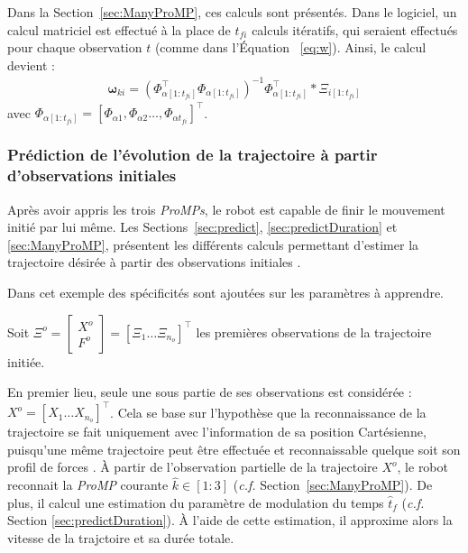 \documentclass[utf8]{frontiersSCNS} %
\newcommand{\rev}[1]{\textcolor{blue}{#1}}
\begin{document}
Dans la Section~\ref{sec:ManyProMP}, ces calculs sont présentés. Dans  le logiciel, un calcul matriciel est effectué à la place de $t_{fi}$ calculs itératifs, qui seraient effectués pour chaque observation $t$ (comme dans l'Équation ~\ref{eq:w}). Ainsi, le calcul devient :
\begin{eqnarray}
\boldsymbol{\omega}_{ki} = (\Phi_{\alpha [1:t_{fi}]}^\top \Phi_{\alpha [1:t_{fi}]})^{-1} \Phi_{\alpha [1:t_{fi}]}^\top * \Xi_{i {[1:t_{fi}]}}
\end{eqnarray}
avec $\Phi_{\alpha [1:t_{fi}]} = [\Phi_{\alpha 1}, \Phi_{\alpha 2}\ldots,\Phi_{\alpha t_{fi}}]^\top$.


\subsubsection{Prédiction de l'évolution de la trajectoire à partir d'observations initiales}
\label{prediction}

Après avoir appris les trois \textit{ProMPs}, le robot est capable de finir le mouvement initié par lui même. Les Sections~\ref{sec:predict}, \ref{sec:predictDuration} et \ref{sec:ManyProMP}, présentent les différents calculs permettant d'estimer la trajectoire désirée à partir des observations initiales . %

Dans cet exemple des spécificités sont ajoutées sur les paramètres à apprendre.

Soit $\Xi^{o} = \begin{bmatrix} X^o \\ F^o \end{bmatrix} = [\Xi_1 \ldots \Xi_{n_o}]^\top$ les premières observations de la trajectoire initiée.

En premier lieu, seule une sous partie de ses observations est considérée : $X^{o} = [X_1 \ldots X_{n_o}]^\top$. Cela se base sur l'hypothèse que la reconnaissance de la trajectoire se fait uniquement avec l'information de sa position Cartésienne, puisqu'une même trajectoire peut être effectuée et reconnaissable quelque soit son profil de forces .
À partir de l'observation partielle de la trajectoire $X^o$, le robot reconnait la \textit{ProMP} courante $\hat{k} \in [1:3]$ (\textit{c.f.} Section~\ref{sec:ManyProMP}). De plus, il calcul une estimation du paramètre de modulation du temps $\hat{t}_f$ (\textit{c.f.} Section \ref{sec:predictDuration}). À l'aide de cette estimation, il approxime alors la vitesse de la trajctoire et sa durée totale.
\end{document}
